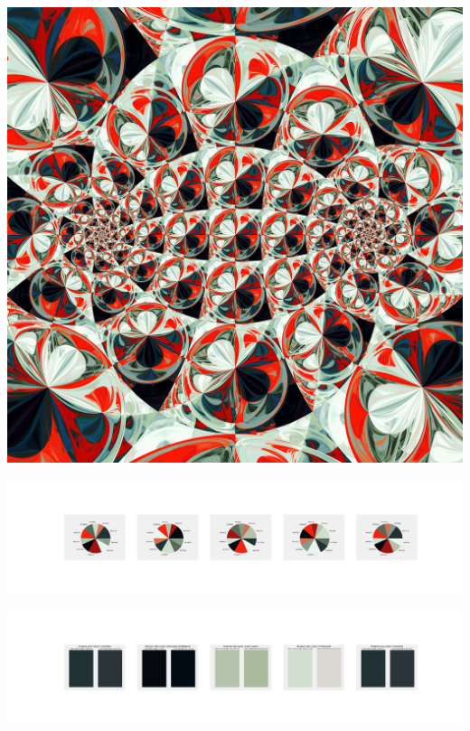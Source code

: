 \documentclass[11pt]{article}
\begin{document}
\begin{landscape}
    \begin{center}
    \includegraphics[width=\textwidth]{./nbimg/file (281).jpg}
    \end{center}

    \begin{center}
    \includegraphics[width=250mm]{./nbimg/pie-202.jpg}
    \end{center}

    \begin{center}
    \includegraphics[width=250mm]{./nbimg/peak-202.jpg}
    \end{center}
    


\end{landscape}
\end{document}
